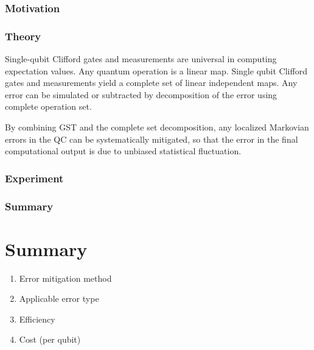 \documentclass[11pt, oneside]{article}   	%
\begin{document}
\subsubsection{Motivation}
\subsubsection{Theory}
Single-qubit Clifford gates and measurements are universal in  computing expectation values.
Any quantum operation is a linear map.
Single qubit Clifford gates and measurements yield a complete set of linear independent maps.
Any error can be simulated or subtracted by decomposition of the error using complete operation set.

By combining GST and the complete set decomposition, any localized Markovian errors in the QC can be systematically mitigated, 
so that the error in the final computational output is due to unbiased statistical fluctuation.

\subsubsection{Experiment}
\subsubsection{Summary}

\section{Summary}
\begin{enumerate}
\item {Error mitigation method}
\item {Applicable error type}
\item {Efficiency}
\item {Cost (per qubit)}
\end{enumerate}
\end{document}

